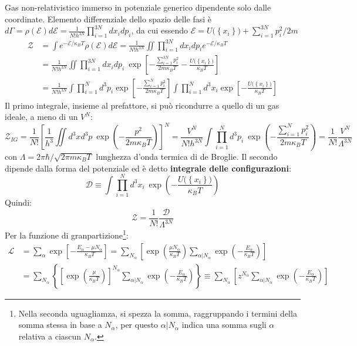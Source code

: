 \documentclass[10pt, a4paper]{scrartcl}
\numberwithin{equation}{subsection}
\theoremstyle{style1}
\theoremstyle{style2}
\begin{document}
Gas non-relativistico immerso in potenziale generico dipendente solo dalle coordinate. Elemento differenziale dello spazio delle fasi \`e $d\Gamma = \rho (\mathscr{E}) d \mathscr{E} = \frac{1}{N!h^{3N} } \prod_{i=1} ^{3N} dx_i dp_i$, da cui essendo $\mathscr{E} = U\big(\left\{ x_i \right\} \big) + \sum_{i=1}^{3N} p_i^2 / 2m$
\[
	\begin{split}
	\mathscr{Z} &= \int e^{- \mathscr{E} / \kappa _B T}  \rho (\mathscr{E}) d \mathscr{E} = \frac{1}{N! h^{3N} }\iint \prod_{i=1} ^{3N} dx_i dp_i e^{- \mathscr{E} / \kappa _B T} \\
			    &= \frac{1}{N! h^{3N} } \iint \prod_{i=1} ^{3N} dx_i dp_i \ \exp \left[ - \frac{\sum_{i=1}^{3N} p_i^2}{2m\kappa _B T} - \frac{U \big(\left\{ x_i \right\} \big)}{\kappa _BT} \right] \\
			    &=\frac{1}{N! h^{3N} } \int \prod _{i=1} ^N d^3 p_i \exp \left[ - \frac{\sum_{i=1}^{N} p_i  ^2}{2m \kappa _B T} \right] \int \prod_{i=1} ^N d^3 x_i \exp\left[ - \frac{U\big(\left\{ x_i \right\} \big)}{\kappa _B T} \right] 
	\end{split}
\] 
Il primo integrale, insieme al prefattore, si pu\`o ricondurre a quello di un gas ideale, a meno di un $V^N$:
\[
		\mathscr{Z}_{IG}= \frac{1}{N!} \left[ \frac{1}{h^3} \iint d^3 x d^3 p \ \exp \left( - \frac{p^2}{2m\kappa _B T } \right) \right] ^N= \frac{V^N}{N! h^{3N} } \int \prod_{i=1} ^N d^3 p_i \ \exp \left(-\frac{\sum_{i=1}^{N} p_i^2}{2m\kappa _BT}\right) = \frac{1}{N!} \frac{V^N}{\Lambda ^{3N} }
\] 
con $\Lambda = 2\pi \hbar /\sqrt{2\pi m\kappa _B T} $ lunghezza d'onda termica di de Broglie. Il secondo dipende dalla forma del potenziale ed \`e detto \textbf{integrale delle configurazioni}:
\begin{equation}
	\mathscr{D} \equiv \int \prod_{i=1} ^N	d^3 x_i \ \exp \left(- \frac{U\big(\left\{ x_i \right\} \big)}{\kappa _BT}\right) 
\end{equation}
Quindi:
\begin{equation}
\mathscr{Z} = \frac{1}{N!} \frac{\mathscr{D}}{\Lambda ^{3N} }
\end{equation}
Per la funzione di granpartizione\footnote{Nella seconda uguagliamza, si spezza la somma, raggruppando i termini della somma stessa in base a $N_\alpha $, per questo $\alpha | N_\alpha $ indica una somma sugli $\alpha $ relativa a ciascun $N_\alpha $.}:
\begin{equation}
	\begin{split}
		\mathscr{L} &= \sum_{\alpha }^{} \exp \left[ - \frac{E_\alpha  - \mu  N_\alpha }{\kappa _B T} \right] = \sum_{N_\alpha }^{} \left[ \exp \left(\frac{\mu N_\alpha }{\kappa _B T}\right) \sum_{\alpha | N_\alpha }^{} \exp \left(- \frac{E_\alpha }{\kappa _B T}\right)  \right] \\
			    & =\sum_{N_\alpha }^{} \left\{ \left[ \exp \left(\frac{\mu }{\kappa _BT}\right)  \right] ^{N_\alpha } \sum_{\alpha | N_\alpha }^{} \exp \left(-\frac{E_\alpha }{\kappa _BT}\right)  \right\} \equiv \sum_{N_\alpha }^{} \left[ z^{N_\alpha } \sum_{\alpha | N_\alpha }^{} \exp\left(- \frac{E_\alpha }{\kappa _BT}\right)  \right] 
	\end{split}
\end{equation}
\end{document}
